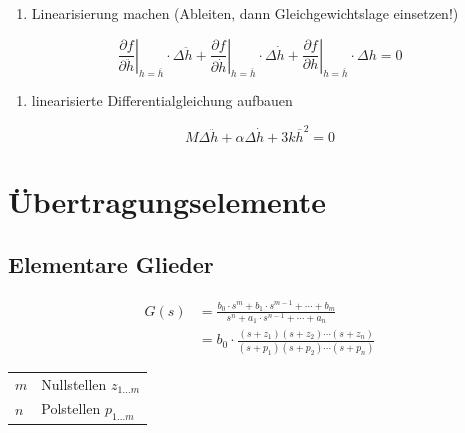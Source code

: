 \documentclass[
  10pt,
  a4paper,
  twocolumn]{article}
\makeatletter
\providecommand{\tightlist}{%
  \setlength{\itemsep}{0pt}\setlength{\parskip}{0pt}}\usepackage{longtable,booktabs,array}
\numberwithin{equation}{section}
\newenvironment{conditions}
  {\par\vspace{\abovedisplayskip}\noindent\begin{tabular}{>{$}l<{$} @{${}:{}$} l}}
  {\end{tabular}\par\vspace{\belowdisplayskip}}
\makeatother
\begin{document}
\begin{tcolorbox}
\small

\begin{enumerate}
\def\labelenumi{\arabic{enumi}.}
\setcounter{enumi}{3}
\tightlist
\item
  Linearisierung machen (Ableiten, dann Gleichgewichtslage einsetzen!)
\end{enumerate}

\normalsize

\[
\left.\frac{\partial f}{\partial \ddot{h}}\right\rvert_{h=\overline{h}} \cdot \Delta\ddot{h} + \left.\frac{\partial f}{\partial \dot{h}}\right\rvert_{h=\overline{h}} \cdot \Delta\dot{h} + \left.\frac{\partial f}{\partial h}\right\rvert_{h=\overline{h}} \cdot \Delta{h} = 0
\]

\small

\begin{enumerate}
\def\labelenumi{\arabic{enumi}.}
\setcounter{enumi}{4}
\tightlist
\item
  linearisierte Differentialgleichung aufbauen
\end{enumerate}

\normalsize

\[
M\Delta \ddot{h} + \alpha \Delta \dot{h} + 3 k\overline{h}^2=0
\]

\end{tcolorbox}

\hypertarget{uxfcbertragungselemente}{%
\section{Übertragungselemente}\label{uxfcbertragungselemente}}

\hypertarget{elementare-glieder}{%
\subsection{Elementare Glieder}\label{elementare-glieder}}

\[
\begin{split}
G(s) &= \frac{b_0\cdot s^m+b_1\cdot s^{m-1}+\cdots+b_m}{s^n+a_1\cdot s^{n-1}+\cdots+a_n} \\
 &= b_0\cdot\frac{(s+z_1)(s+z_2)\cdots(s+z_n)}{(s+p_1)(s+p_2)\cdots(s+p_n)}
\end{split}
\]

\begin{conditions}
  m & Nullstellen $z_{1\dots m}$ \\
  n & Polstellen $p_{1\dots m}$ \\
\end{conditions}
\end{document}
